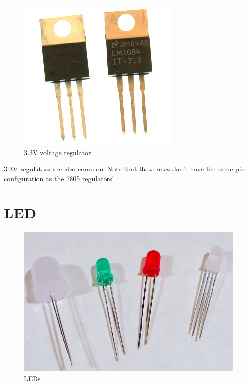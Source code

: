 \begin{figure}[!htb]
     \centering
     \includegraphics[scale=0.3]{img/components/v_reg_33v.jpg}
     \caption{3.3V voltage regulator}
     \label{3.3V voltage regulator}
\end{figure}

3.3V regulators are also common. Note that these ones don't have the same pin configuration as the 7805 regulators!

\section{LED}

\begin{figure}[!htb]
     \centering
     \includegraphics[scale=0.3]{img/components/leds.jpg}
     \caption{LEDs}
     \label{LEDs}
\end{figure}

